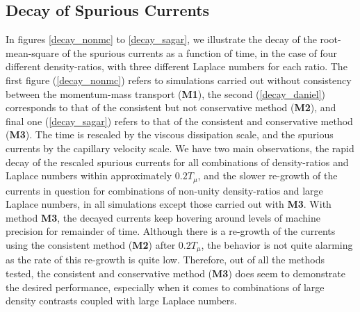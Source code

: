 \subsection*{Decay of Spurious Currents}

In figures \ref{decay_nonmc} to \ref{decay_sagar}, we illustrate the decay of the root-mean-square of the spurious currents as a function of time, in the case of four different density-ratios, with three different Laplace numbers for each ratio. The first figure (\ref{decay_nonmc}) refers to simulations carried out without consistency between the momentum-mass transport (\textbf{M1}), the second (\ref{decay_daniel}) corresponds to that of the consistent but not conservative method (\textbf{M2}), and final one (\ref{decay_sagar}) refers to that of the consistent and conservative method (\textbf{M3}). The time is rescaled by the viscous dissipation scale, and the spurious currents by the capillary velocity scale. We have two main observations, the rapid decay of the rescaled spurious currents for all combinations of density-ratios and Laplace numbers within approximately $0.2 T_{\mu}$, and the slower re-growth of the currents in question for combinations of non-unity density-ratios and large Laplace numbers, in all simulations except those carried out with \textbf{M3}. With method \textbf{M3}, the decayed currents keep hovering around levels of machine precision for remainder of time. Although there is a re-growth of the currents using the consistent method (\textbf{M2}) after $0.2 T_{\mu}$, the behavior is not quite alarming as the rate of this re-growth is quite low. Therefore, out of all the methods tested, the consistent and conservative method (\textbf{M3}) does seem to demonstrate the desired performance, especially when it comes to combinations of large density contrasts coupled with large Laplace numbers.   


